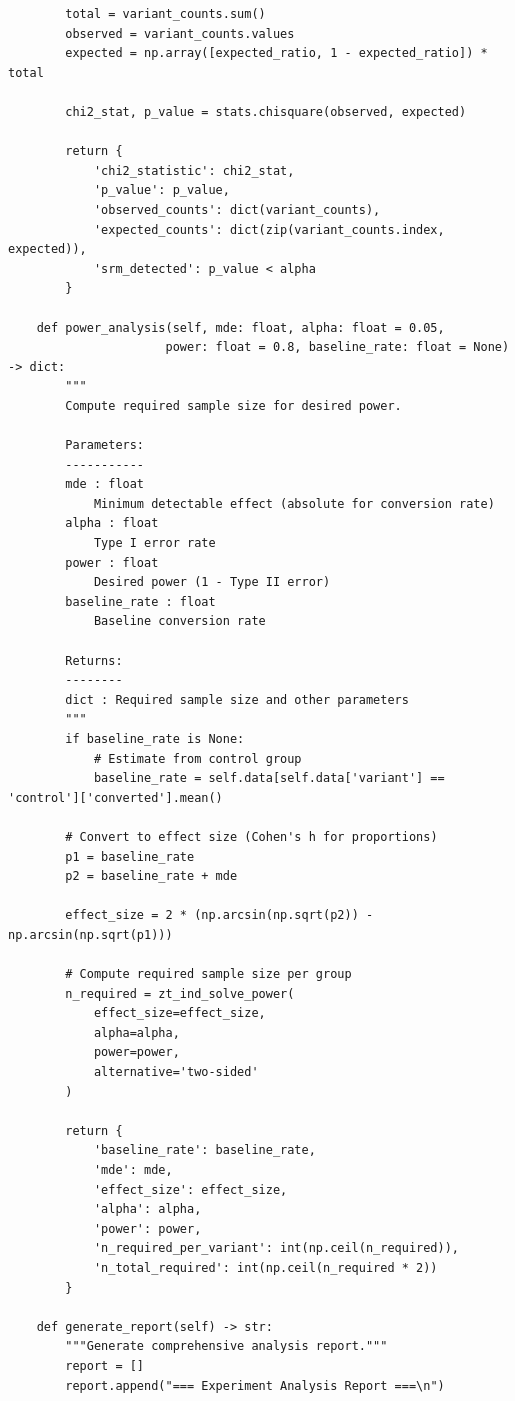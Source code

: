 \begin{lstlisting}
        total = variant_counts.sum()
        observed = variant_counts.values
        expected = np.array([expected_ratio, 1 - expected_ratio]) * total

        chi2_stat, p_value = stats.chisquare(observed, expected)

        return {
            'chi2_statistic': chi2_stat,
            'p_value': p_value,
            'observed_counts': dict(variant_counts),
            'expected_counts': dict(zip(variant_counts.index, expected)),
            'srm_detected': p_value < alpha
        }

    def power_analysis(self, mde: float, alpha: float = 0.05,
                      power: float = 0.8, baseline_rate: float = None) -> dict:
        """
        Compute required sample size for desired power.

        Parameters:
        -----------
        mde : float
            Minimum detectable effect (absolute for conversion rate)
        alpha : float
            Type I error rate
        power : float
            Desired power (1 - Type II error)
        baseline_rate : float
            Baseline conversion rate

        Returns:
        --------
        dict : Required sample size and other parameters
        """
        if baseline_rate is None:
            # Estimate from control group
            baseline_rate = self.data[self.data['variant'] == 'control']['converted'].mean()

        # Convert to effect size (Cohen's h for proportions)
        p1 = baseline_rate
        p2 = baseline_rate + mde

        effect_size = 2 * (np.arcsin(np.sqrt(p2)) - np.arcsin(np.sqrt(p1)))

        # Compute required sample size per group
        n_required = zt_ind_solve_power(
            effect_size=effect_size,
            alpha=alpha,
            power=power,
            alternative='two-sided'
        )

        return {
            'baseline_rate': baseline_rate,
            'mde': mde,
            'effect_size': effect_size,
            'alpha': alpha,
            'power': power,
            'n_required_per_variant': int(np.ceil(n_required)),
            'n_total_required': int(np.ceil(n_required * 2))
        }

    def generate_report(self) -> str:
        """Generate comprehensive analysis report."""
        report = []
        report.append("=== Experiment Analysis Report ===\n")


\end{lstlisting}
